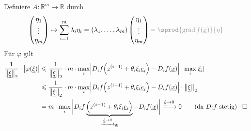 Definiere $A : \mathds{R}^m \to \mathds{R}$ durch 
\[
	\begin{pmatrix}
	\eta_1 \\ \vdots \\ \eta_m
\end{pmatrix} \mapsto \sum_{i=1}^{m} \lambda_i \eta_i = (\lambda_1, \ldots , \lambda_m)\begin{pmatrix}
	\eta_1 \\ \vdots \\ \eta_m
\end{pmatrix} {\color{light_gray} = \sprod{\grad f(\underline{x})}{\underline{\eta}} }
\]
Für $\varphi$ gilt
\begin{align*}
	\frac{1}{\norm[2]{\underline{\xi}}} \cdot \abs*{\varphi (\underline{\xi} )} &\le \frac{1}{\norm[2]{\underline{\xi}}} \cdot m \cdot \max_i 
	\abs*{D_i f \enbrace*{z^{(i-1)} + \theta_i \xi_i \underline{e}_i } - D_i f (\underline{x}) } \cdot \max_i \abs*{\xi_i}\\
	&\le \frac{1}{\norm[2]{\underline{\xi} } } \cdot m \cdot \max_i \abs*{D_i f \enbrace*{z^{(i-1)} + \theta_i \xi_i \underline{e}_i } - D_i f (\underline{x}) } \cdot 
	\norm[2]{\underline{\xi} }   \\
	&= m \cdot \max_i \bigg| D_i f \underbrace{\enbrace*{z^{(i-1)} + \theta_i \xi_i \underline{e}_i }}_{\xrightarrow{\underline{\xi}  \to 0} \underline{x}  } 
	- D_i f (\underline{x}) \bigg| \xrightarrow{\underline{\xi}  \to 0} 0  \tag*{(da $D_i f$ stetig) \enspace $\square$}
\end{align*}

